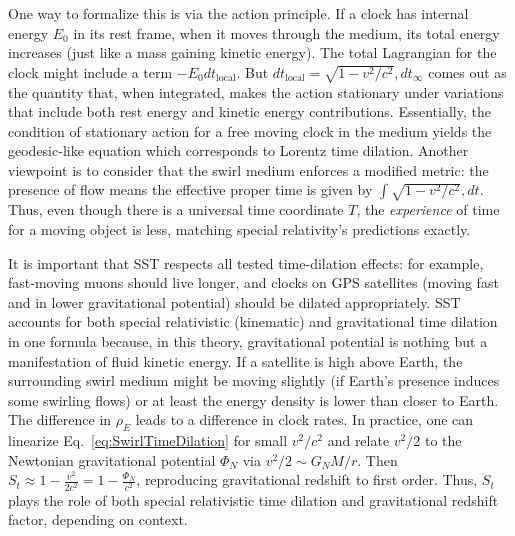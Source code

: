 \documentclass[10pt,reprint,aps,onecolumn,nofootinbib]{revtex4-2}
\newcommand{\rhoE}{\rho_{\!E}}                           %
\begin{document}
One way to formalize this is via the action principle. If a clock has internal energy $E_0$ in its rest frame, when it moves through the medium, its total energy increases (just like a mass gaining kinetic energy). The total Lagrangian for the clock might include a term $-E_0 dt_{\text{local}}$. But $dt_{\text{local}} = \sqrt{1-v^2/c^2}, dt_{\infty}$ comes out as the quantity that, when integrated, makes the action stationary under variations that include both rest energy and kinetic energy contributions. Essentially, the condition of stationary action for a free moving clock in the medium yields the geodesic-like equation which corresponds to Lorentz time dilation. Another viewpoint is to consider that the swirl medium enforces a modified metric: the presence of flow means the effective proper time is given by $\int \sqrt{1-v^2/c^2},dt$. Thus, even though there is a universal time coordinate $T$, the \emph{experience} of time for a moving object is less, matching special relativity’s predictions exactly.


It is important that SST respects all tested time-dilation effects: for example, fast-moving muons should live longer, and clocks on GPS satellites (moving fast and in lower gravitational potential) should be dilated appropriately. SST accounts for both special relativistic (kinematic) and gravitational time dilation in one formula because, in this theory, gravitational potential is nothing but a manifestation of fluid kinetic energy. If a satellite is high above Earth, the surrounding swirl medium might be moving slightly (if Earth’s presence induces some swirling flows) or at least the energy density is lower than closer to Earth. The difference in $\rhoE$ leads to a difference in clock rates. In practice, one can linearize Eq.~\eqref{eq:SwirlTimeDilation} for small $v^2/c^2$ and relate $v^2/2$ to the Newtonian gravitational potential $\Phi_N$ via $v^2/2 \sim G_N M/r$. Then $S_t \approx 1 - \frac{v^2}{2c^2} = 1 - \frac{\Phi_N}{c^2}$, reproducing gravitational redshift to first order. Thus, $S_t$ plays the role of both special relativistic time dilation and gravitational redshift factor, depending on context.
\end{document}

